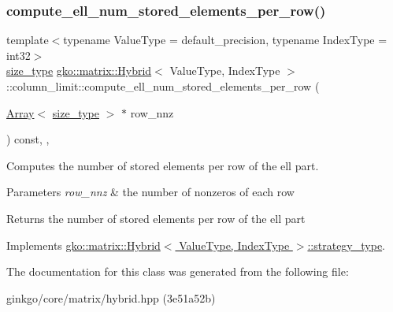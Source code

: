 \subsubsection{\texorpdfstring{compute\+\_\+ell\+\_\+num\+\_\+stored\+\_\+elements\+\_\+per\+\_\+row()}{compute\_ell\_num\_stored\_elements\_per\_row()}}
{\footnotesize\ttfamily template$<$typename Value\+Type = default\+\_\+precision, typename Index\+Type = int32$>$ \\
\hyperlink{namespacegko_a6e5c95df0ae4e47aab2f604a22d98ee7}{size\+\_\+type} \hyperlink{classgko_1_1matrix_1_1Hybrid}{gko\+::matrix\+::\+Hybrid}$<$ Value\+Type, Index\+Type $>$\+::column\+\_\+limit\+::compute\+\_\+ell\+\_\+num\+\_\+stored\+\_\+elements\+\_\+per\+\_\+row (\begin{DoxyParamCaption}\item[{\hyperlink{classgko_1_1Array}{Array}$<$ \hyperlink{namespacegko_a6e5c95df0ae4e47aab2f604a22d98ee7}{size\+\_\+type} $>$ $\ast$}]{row\+\_\+nnz }\end{DoxyParamCaption}) const\hspace{0.3cm}{\ttfamily [inline]}, {\ttfamily [override]}, {\ttfamily [virtual]}}



Computes the number of stored elements per row of the ell part. 


\begin{DoxyParams}{Parameters}
{\em row\+\_\+nnz} & the number of nonzeros of each row\\
\hline
\end{DoxyParams}
\begin{DoxyReturn}{Returns}
the number of stored elements per row of the ell part 
\end{DoxyReturn}


Implements \hyperlink{classgko_1_1matrix_1_1Hybrid_1_1strategy__type_a0a0cd4024f27c7d0f286f35fc0a6de60}{gko\+::matrix\+::\+Hybrid$<$ Value\+Type, Index\+Type $>$\+::strategy\+\_\+type}.



The documentation for this class was generated from the following file\+:\begin{DoxyCompactItemize}
\item 
ginkgo/core/matrix/hybrid.\+hpp (3e51a52b)\end{DoxyCompactItemize}
